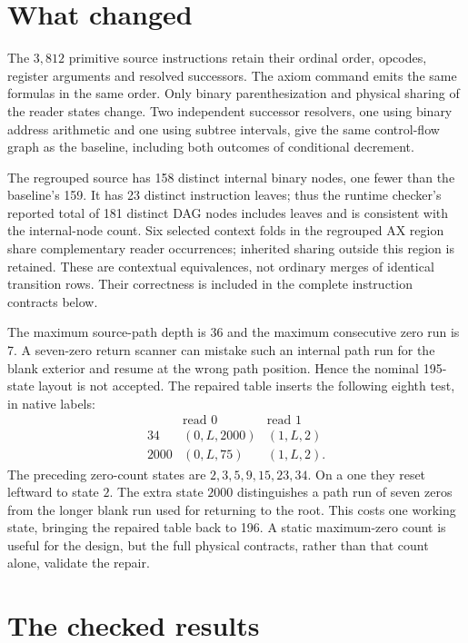 \documentclass[11pt]{article}
\begin{document}
\section{What changed}

The $3{,}812$ primitive source instructions retain their ordinal
order, opcodes, register arguments and resolved successors.  The
axiom command emits the same formulas in the same order.  Only
binary parenthesization and physical sharing of the reader states
change.  Two independent successor resolvers, one using binary
address arithmetic and one using subtree intervals, give the same
control-flow graph as the baseline, including both outcomes of
conditional decrement.

The regrouped source has 158 distinct internal binary nodes, one
fewer than the baseline's 159.  It has 23 distinct instruction leaves;
thus the runtime checker's reported total of 181 distinct DAG nodes
includes leaves and is consistent with the internal-node count.
Six selected context folds in the regrouped AX region share
complementary reader occurrences; inherited sharing outside this
region is retained.  These are contextual equivalences, not ordinary
merges of identical transition rows.  Their correctness is included
in the complete instruction contracts below.

The maximum source-path depth is 36 and the maximum consecutive
zero run is 7.  A seven-zero return scanner can mistake such an
internal path run for the blank exterior and resume at the wrong
path position.  Hence the nominal 195-state layout is not accepted.
The repaired table inserts the following eighth test, in native
labels:
\[
 \begin{array}{c|cc}
       &\text{read }0&\text{read }1\\ \hline
 34&(0,L,2000)&(1,L,2)\\
 2000&(0,L,75)&(1,L,2).
 \end{array}
\]
The preceding zero-count states are
$2,3,5,9,15,23,34$.  On a one they reset leftward to state $2$.
The extra state $2000$ distinguishes a path run of seven zeros from
the longer blank run used for returning to the root.  This costs
one working state, bringing the repaired table back to 196.
A static maximum-zero count is useful for the design, but the full
physical contracts, rather than that count alone, validate the repair.

\section{The checked results}
\end{document}
